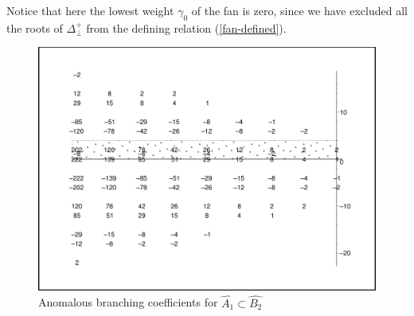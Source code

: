 \documentclass[a4paper,12pt]{article}
\theoremstyle{definition} \newtheorem{Def}{Definition}
\begin{document}
Notice that here the lowest weight  $\gamma_0$ of the fan  is zero, since we have excluded all the roots of $\Delta^{+}_{\bot}$ from the defining relation (\ref{fan-defined}).

\begin{figure}[p]
  \centering
  \includegraphics[width=120mm]{AffineB2_A1_branching.pdf}
  \caption{Anomalous branching coefficients for $\hat{A_1}\subset \hat{B_2}$}
  \label{fig:AffineB2_A1_branching}
\end{figure}
\end{document}
